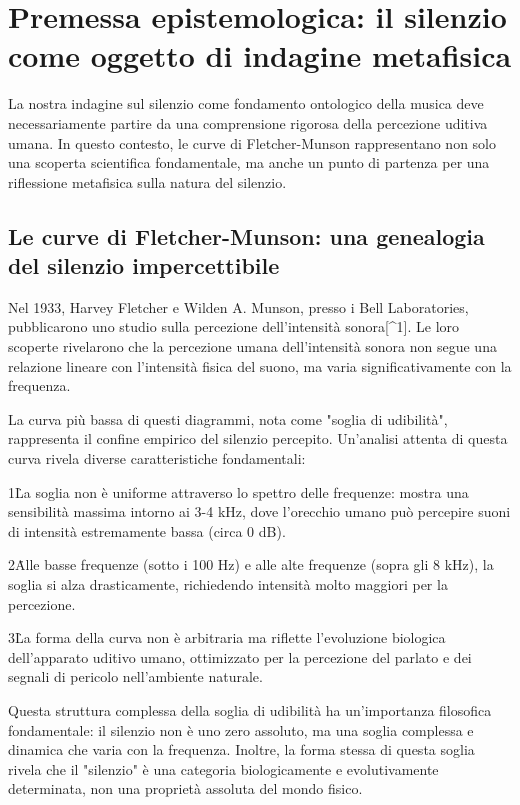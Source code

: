 \documentclass[a4paper,11pt]{article}
\begin{document}
\section{Premessa epistemologica: il silenzio come oggetto di indagine metafisica}

La nostra indagine sul silenzio come fondamento ontologico della musica
deve necessariamente partire da una comprensione rigorosa della
percezione uditiva umana. In questo contesto, le curve di
Fletcher-Munson rappresentano non solo una scoperta scientifica
fondamentale, ma anche un punto di partenza per una riflessione
metafisica sulla natura del silenzio.


\subsection{Le curve di Fletcher-Munson: una genealogia del silenzio impercettibile}

Nel 1933, Harvey Fletcher e Wilden A. Munson, presso i Bell
Laboratories, pubblicarono uno studio sulla percezione dell'intensità
sonora[^1]. Le loro scoperte rivelarono che la percezione umana
dell'intensità sonora non segue una relazione lineare con l'intensità
fisica del suono, ma varia significativamente con la frequenza.

La curva più bassa di questi diagrammi, nota come "soglia di udibilità",
rappresenta il confine empirico del silenzio percepito. Un'analisi
attenta di questa curva rivela diverse caratteristiche fondamentali:

1\. La soglia non è uniforme attraverso lo spettro delle frequenze:
mostra una sensibilità massima intorno ai 3-4 kHz, dove l'orecchio umano
può percepire suoni di intensità estremamente bassa (circa 0 dB).

2\. Alle basse frequenze (sotto i 100 Hz) e alle alte frequenze (sopra
gli 8 kHz), la soglia si alza drasticamente, richiedendo intensità molto
maggiori per la percezione.

3\. La forma della curva non è arbitraria ma riflette l'evoluzione
biologica dell'apparato uditivo umano, ottimizzato per la percezione del
parlato e dei segnali di pericolo nell'ambiente naturale.

Questa struttura complessa della soglia di udibilità ha un'importanza
filosofica fondamentale: il silenzio non è uno zero assoluto, ma una
soglia complessa e dinamica che varia con la frequenza. Inoltre, la
forma stessa di questa soglia rivela che il "silenzio" è una categoria
biologicamente e evolutivamente determinata, non una proprietà assoluta
del mondo fisico.
\end{document}
